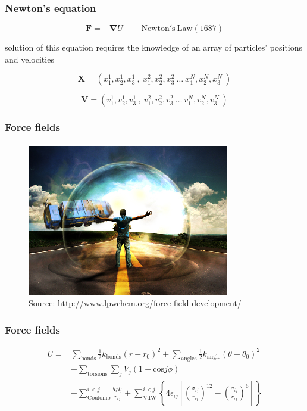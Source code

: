 \documentclass{beamer}
\begin{document}
\begin{frame}
  \frametitle{Newton's equation}
  
  \begin{equation}
	  \mathbf{F}= - \mathbf{\nabla} U      \mathrm{~~~~~~~~~~Newton's~ Law (1687)}
  \end{equation}

  solution of this equation requires the knowledge of an array of
  particles' positions and velocities

  \begin{equation}
          \mathbf{X}= (x^1_1,x^1_2,x^1_3 ~,~ x^2_1,x^2_2,x^2_3 ~\ldots~ x^N_1,x^N_2,x^N_3~)
  \end{equation}


  \begin{equation}
          \mathbf{V}= (v^1_1,v^1_2,v^1_3~,~ v^2_1,v^2_2,v^2_3 ~\ldots~ v^N_1,v^N_2,v^N_3~)
  \end{equation}

\end{frame}


\begin{frame}\frametitle{Force fields}

\begin{figure}
\includegraphics[scale=1.481]{force_field_squarespace.eps}
\caption{{\scriptsize Source: http://www.lpwchem.org/force-field-development/}}
\end{figure}

\end{frame}

\begin{frame}\frametitle{Force fields}

\begin{equation}
\begin{aligned}
	U  = & \sum_{\textrm{bonds}} \frac{1}{2} k_{\textrm{bonds}} (r-r_0)^2 + \sum_{\textrm{angles}} \frac{1}{2} k_{\textrm{angle}} 
	(\theta-\theta_0)^2 \\
	&+\sum_{\textrm{torsions}} \sum_j V_j(1+\textrm{cos}j\phi)  \\
 &+ \sum_{\textrm{Coulomb}}^{i<j} \frac{q_i q_j}{r_{ij}}  +  \sum_{\textrm{VdW}}^{i<j} 
\left\{ 4\epsilon_{ij} \left[ \left( \frac{\sigma_{ij}}{r_{ij}} \right)^{12}-  \left( \frac{\sigma_{ij}}{r_{ij}} \right)^{6} \right]  \right\}
\end{aligned}
\end{equation}


\end{frame}
\end{document}
